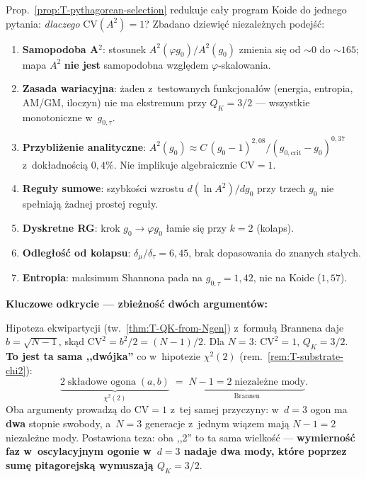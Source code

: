 \begin{remark}[Dlaczego $\mathrm{CV} = 1$? --- \'scie\.zka 22 (v47b)]%
\label{rem:T-cv1-origin}
Prop.~\ref{prop:T-pythagorean-selection} redukuje ca\l{}y program Koide
do jednego pytania: \emph{dlaczego} $\mathrm{CV}(A^2) = 1$?
Zbadano dziewi\k{e}\'c niezale\.znych podej\'s\'c:

\begin{enumerate}[nosep]
  \item \textbf{Samopodoba A$^2$}: stosunek $A^2(\varphi g_0)/A^2(g_0)$
    zmienia si\k{e} od $\sim 0$ do $\sim 165$; mapa $A^2$ \textbf{nie jest}
    samopodobna wzgl\k{e}dem $\varphi$-skalowania.
  \item \textbf{Zasada wariacyjna}: \.zaden z~testowanych funkcjona\l{}\'ow
    (energia, entropia, AM/GM, iloczyn) nie ma ekstremum przy $Q_K = 3/2$
    --- wszystkie monotoniczne w~$g_{0,\tau}$.
  \item \textbf{Przybli\.zenie analityczne}:
    $A^2(g_0) \approx C\,(g_0{-}1)^{2{,}08}/(g_{0,\mathrm{crit}}{-}g_0)^{0{,}37}$
    z~dok\l{}adno\'sci\k{a} $0{,}4\%$.
    Nie implikuje algebraicznie $\mathrm{CV} = 1$.
  \item \textbf{Regu\l{}y sumowe}: szybko\'sci wzrostu $d(\ln A^2)/dg_0$
    przy trzech $g_0$ nie spe\l{}niaj\k{a} \.zadnej prostej regu\l{}y.
  \item \textbf{Dyskretne RG}: krok $g_0 \to \varphi g_0$
    \l{}amie si\k{e} przy $k = 2$ (kolaps).
  \item \textbf{Odleg\l{}o\'s\'c od kolapsu}: $\delta_\mu/\delta_\tau
    = 6{,}45$, brak dopasowania do znanych sta\l{}ych.
  \item \textbf{Entropia}: maksimum Shannona pada na $g_{0,\tau} = 1{,}42$,
    nie na Koide ($1{,}57$).
\end{enumerate}

\medskip\noindent
\textbf{Kluczowe odkrycie --- zbie\.zno\'s\'c dw\'och argument\'ow:}

Hipoteza ekwipartycji (tw.~\ref{thm:T-QK-from-Ngen})
z~formu\l{}\k{a} Brannena daje $b = \sqrt{N{-}1}$, sk\k{a}d
$\mathrm{CV}^2 = b^2/2 = (N{-}1)/2$.
Dla $N = 3$: $\mathrm{CV}^2 = 1$, $Q_K = 3/2$.
\textbf{To jest ta sama ,,dw\'ojka''} co w~hipotezie $\chi^2(2)$
(rem.~\ref{rem:T-substrate-chi2}):
\[
  \underbrace{2\;\text{sk\l{}adowe ogona}\;(a,b)}_{\chi^2(2)}
  \;=\;
  \underbrace{N - 1 = 2\;\text{niezale\.zne mody}}_{\text{Brannen}}.
\]
Oba argumenty prowadz\k{a} do $\mathrm{CV} = 1$ z~tej samej
przyczyny: w~$d = 3$ ogon ma \textbf{dwa} stopnie swobody,
a~$N = 3$ generacje z~jednym wi\k{a}zem maj\k{a} $N{-}1 = 2$
niezale\.zne mody. Postawiona teza: oba ,,2'' to ta sama
wielko\'s\'c --- \textbf{wymierno\'s\'c faz w~oscylacyjnym ogonie
w~$d = 3$ nadaje dwa mody, kt\'ore poprzez sum\k{e}
pitagorejsk\k{a} wymuszaj\k{a} $Q_K = 3/2$}.


\end{remark}
